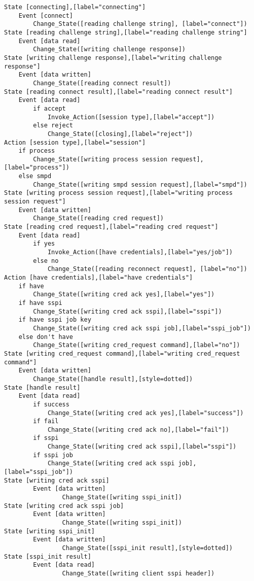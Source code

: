 \begin{comment}
This is the state machine for the smpd connect command.
Graph [smpd connect],
      [size="7.5, 10"]
\end{comment}
\begin{verbatim}
State [connecting],[label="connecting"]
	Event [connect]
		Change_State([reading challenge string], [label="connect"])
State [reading challenge string],[label="reading challenge string"]
	Event [data read]
		Change_State([writing challenge response])
State [writing challenge response],[label="writing challenge response"]
	Event [data written]
		Change_State([reading connect result])
State [reading connect result],[label="reading connect result"]
	Event [data read]
		if accept
			Invoke_Action([session type],[label="accept"])
		else reject
			Change_State([closing],[label="reject"])
Action [session type],[label="session"]
	if process
		Change_State([writing process session request],[label="process"])
	else smpd
		Change_State([writing smpd session request],[label="smpd"])
State [writing process session request],[label="writing process session request"]
	Event [data written]
		Change_State([reading cred request])
State [reading cred request],[label="reading cred request"]
	Event [data read]
		if yes
			Invoke_Action([have credentials],[label="yes/job"])
		else no
			Change_State([reading reconnect request], [label="no"])
Action [have credentials],[label="have credentials"]
	if have
		Change_State([writing cred ack yes],[label="yes"])
	if have sspi
		Change_State([writing cred ack sspi],[label="sspi"])
	if have sspi job key
		Change_State([writing cred ack sspi job],[label="sspi_job"])
	else don't have
		Change_State([writing cred_request command],[label="no"])
State [writing cred_request command],[label="writing cred_request command"]
	Event [data written]
		Change_State([handle result],[style=dotted])
State [handle result]
	Event [data read]
		if success
			Change_State([writing cred ack yes],[label="success"])
		if fail
			Change_State([writing cred ack no],[label="fail"])
		if sspi
			Change_State([writing cred ack sspi],[label="sspi"])
		if sspi job
			Change_State([writing cred ack sspi job],[label="sspi_job"])
State [writing cred ack sspi]
        Event [data written]
                Change_State([writing sspi_init])
State [writing cred ack sspi job]
		Event [data written]
				Change_State([writing sspi_init])
State [writing sspi_init]
        Event [data written]
                Change_State([sspi_init result],[style=dotted])
State [sspi_init result]
        Event [data read]
                Change_State([writing client sspi header])

\end{verbatim}
